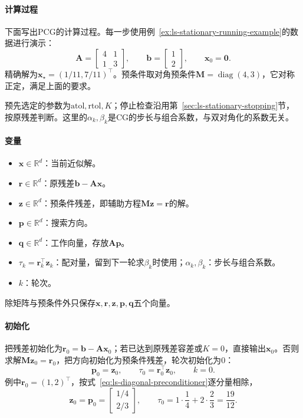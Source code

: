 \paragraph{计算过程}
下面写出PCG的计算过程。每一步使用例~\ref{ex:ls-stationary-running-example}的数据进行演示：
\[
 \bm A=\begin{bmatrix}4&1\\1&3\end{bmatrix},\qquad
 \bm b=\begin{bmatrix}1\\2\end{bmatrix},\qquad
 \bm x_0=\bm0 .
\]
精确解为$\bm x_\star=(1/11,7/11)^\top$。预条件取对角预条件$\bm M=\operatorname{diag}(4,3)$，它对称正定，满足上面的要求。

预先选定的参数为$\mathrm{atol},\mathrm{rtol},K$；停止检查沿用第~\ref{sec:ls-stationary-stopping}节，按原残差判断。这里的$\alpha_k,\beta_k$是CG的步长与组合系数，与双对角化的系数无关。

\paragraph{变量}
\begin{itemize}
 \item $\bm x\in\mathbb R^d$：当前近似解。
 \item $\bm r\in\mathbb R^d$：原残差$\bm b-\bm A\bm x$。
 \item $\bm z\in\mathbb R^d$：预条件残差，即辅助方程$\bm M\bm z=\bm r$的解。
 \item $\bm p\in\mathbb R^d$：搜索方向。
 \item $\bm q\in\mathbb R^d$：工作向量，存放$\bm A\bm p$。
 \item $\tau_k=\bm r_k^\top\bm z_k$：配对量，留到下一轮求$\beta_k$时使用；$\alpha_k,\beta_k$：步长与组合系数。
 \item $k$：轮次。
\end{itemize}
除矩阵与预条件外只保存$\bm x,\bm r,\bm z,\bm p,\bm q$五个向量。

\paragraph{初始化}
把残差初始化为$\bm r_0=\bm b-\bm A\bm x_0$；若已达到原残差容差或$K=0$，直接输出$\bm x_0$。否则求解$\bm M\bm z_0=\bm r_0$，把方向初始化为预条件残差，轮次初始化为$0$：
\[
 \bm p_0=\bm z_0,\qquad \tau_0=\bm r_0^\top\bm z_0,\qquad k=0 .
\]
例中$\bm r_0=(1,2)^\top$，按式~\eqref{eq:ls-diagonal-preconditioner}逐分量相除，
\[
 \bm z_0=\bm p_0=\begin{bmatrix}1/4\\2/3\end{bmatrix},\qquad
 \tau_0=1\cdot\frac14+2\cdot\frac23=\frac{19}{12}.
\]

